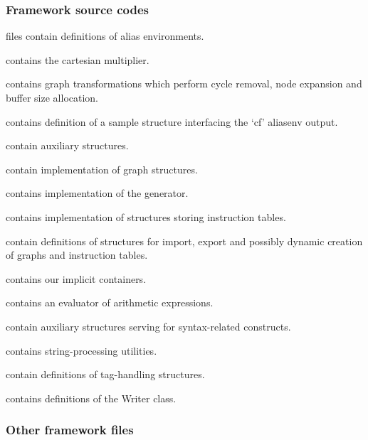 \subsubsection{Framework source codes}
\label{sec:directories}
\begin{description}
  \item {} files contain definitions of alias environments.
  \item {} contains the cartesian multiplier.
  \item {} contains graph transformations which perform cycle removal, node expansion and buffer size allocation.
  \item {} contains definition of a sample structure interfacing the `cf' aliasenv output.
  \item {} contain auxiliary structures.
  \item {} contain implementation of graph structures.
  \item {} contains implementation of the generator.
  \item {} contains implementation of structures storing instruction tables.
  \item {} contain definitions of structures for import, export and possibly dynamic creation of graphs and instruction tables. 
  \item {} contains our implicit containers.
  \item {} contains an evaluator of arithmetic expressions.
  \item {} contain auxiliary structures serving for syntax-related constructs.
  \item {} contains string-processing utilities.
  \item {} contain definitions of tag-handling structures.
  \item {} contains definitions of the Writer class.
\end{description}

\subsubsection{Other framework files}

